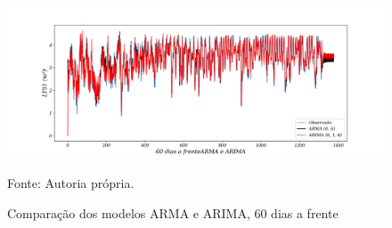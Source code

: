 \begin{figure}[H]
	\centering
	\caption{Comparação dos modelos ARMA e ARIMA, 60 dias a frente }
	\label{fig:60-ARMA-ARIMA}
	\includegraphics[width=1\linewidth]{Apendices/Figuras/modelagem-18-a-21h/60-ARMA-ARIMA}
	
	Fonte: Autoria própria.
\end{figure}